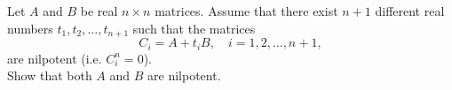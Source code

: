 \documentclass{article}
\begin{document}
	\setlength{\parindent}{0pt}
	Let $A$ and $B$ be real $n\times n$ matrices. Assume that there exist $n+1$ different real numbers $t_1,t_2,\dots,t_{n+1}$ such that the matrices
	$$C_i=A+t_iB,\quad i=1,2,\dots,n+1,$$
	are nilpotent (i.e. $C_i^n=0$).\\
	Show that both $A$ and $B$ are nilpotent.
\end{document}
